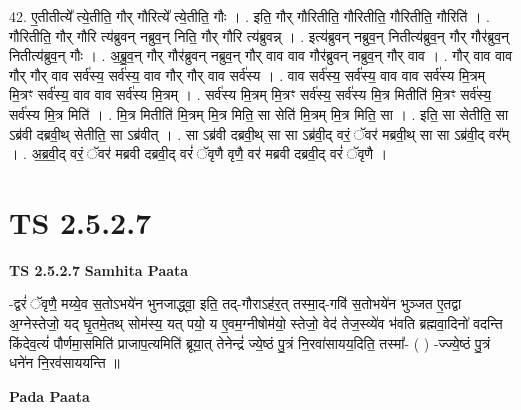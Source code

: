 \documentclass[17pt]{extarticle}
\begin{document}
42. ए॒तीतीत्ये᳚ त्ये॒तीति॒ गौर् गौरित्ये᳚ त्ये॒तीति॒ गौः । . इति॒ गौर् गौरितीति॒ गौरितीति॒ गौरितीति॒ गौरिति॑ । . गौरितीति॒ गौर् गौरि त्य॑ब्रुवन् नब्रुव॒न् निति॒ गौर् गौरि त्य॑ब्रुवन्न् । . इत्य॑ब्रुवन् नब्रुव॒न् नितीत्य॑ब्रुव॒न् गौर् गौर॑ब्रुव॒न् नितीत्य॑ब्रुव॒न् गौः । . अ॒ब्रु॒व॒न् गौर् गौर॑ब्रुवन् नब्रुव॒न् गौर् वाव वाव गौर॑ब्रुवन् नब्रुव॒न् गौर् वाव । . गौर् वाव वाव गौर् गौर् वाव सर्व॑स्य॒ सर्व॑स्य॒ वाव गौर् गौर् वाव सर्व॑स्य । . वाव सर्व॑स्य॒ सर्व॑स्य॒ वाव वाव सर्व॑स्य मि॒त्रम् मि॒त्रꣳ सर्व॑स्य॒ वाव वाव सर्व॑स्य मि॒त्रम् । . सर्व॑स्य मि॒त्रम् मि॒त्रꣳ सर्व॑स्य॒ सर्व॑स्य मि॒त्र मितीति॑ मि॒त्रꣳ सर्व॑स्य॒ सर्व॑स्य मि॒त्र मिति॑ । . मि॒त्र मितीति॑ मि॒त्रम् मि॒त्र मिति॒ सा सेति॑ मि॒त्रम् मि॒त्र मिति॒ सा । . इति॒ सा सेतीति॒ सा ऽब्र॑वी दब्रवी॒थ् सेतीति॒ सा ऽब्र॑वीत् । . सा ऽब्र॑वी दब्रवी॒थ् सा सा ऽब्र॑वी॒द् वरं॒ ॅवर॑ मब्रवी॒थ् सा सा ऽब्र॑वी॒द् वर᳚म् । . अ॒ब्र॒वी॒द् वरं॒ ॅवर॑ मब्रवी दब्रवी॒द् वरं॑ ॅवृणै वृणै॒ वर॑ मब्रवी दब्रवी॒द् वरं॑ ॅवृणै । \newline
\pagebreak
{}

\section{ TS 2.5.2.7 }

\textbf{TS 2.5.2.7 } \newline
\textbf{Samhita Paata} \newline

-द्वरं॑ ॅवृणै॒ मय्ये॒व स॒तोऽभये॑न भुनजाद्ध्वा॒ इति॒ तद्-गौराऽह॑र॒त् तस्मा॒द्-गवि॑ स॒तोभये॑न भुञ्जत ए॒तद्वा अ॒ग्नेस्तेजो॒ यद् घृ॒तमे॒तथ् सोम॑स्य॒ यत् पयो॒ य ए॒वम॒ग्नीषोम॑यो॒ स्तेजो॒ वेद॑ तेज॒स्व्ये॑व भ॑वति ब्रह्मवा॒दिनो॑ वदन्ति किंदेव॒त्यं॑ पौर्णमा॒समिति॑ प्राजाप॒त्यमिति॑ ब्रूया॒त् तेनेन्द्रं॑ ज्ये॒ष्ठं पु॒त्रं नि॒रवा॑सायय॒दिति॒ तस्मा᳚- ( ) -ज्ज्ये॒ष्ठं पु॒त्रं धने॑न नि॒रव॑साययन्ति ॥ \newline

\textbf{Pada Paata} \newline
\end{document}
